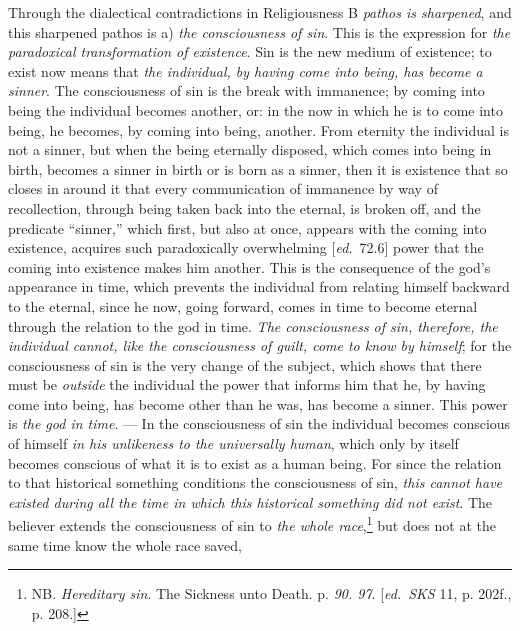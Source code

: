 \documentclass[12pt,a4paper,openany]{book}
\newcommand{\kpage}[1]{\marginnote{\footnotesize\textit{[#1]}}}
\newcommand{\ed}[1]{{\small[\textit{ed.}\ #1]}}
\begin{document}
Through the dialectical contradictions in Religiousness B \emph{pathos is sharpened}, and
this sharpened pathos is a) \emph{the consciousness of sin}. This is the expression
for \emph{the paradoxical transformation of existence}. Sin is the new medium of existence;
to exist now means that \emph{the individual, by having come into being, has become a
sinner}. The consciousness of sin is the break with immanence; by
coming into being the individual becomes another, or: in the now in which he is to come into being,
he becomes, by coming into being, another. From eternity the individual is not
a sinner, but when the being eternally disposed, which comes into being in birth,
\kpage{150}becomes a sinner in birth or is born as a sinner, then it is existence
that so closes in around it that every communication of immanence
by way of recollection, through being taken back into the
eternal, is broken off, and the predicate ``sinner,'' which first, but also at once,
appears with the coming into existence, acquires such paradoxically overwhelming
\ed{72.6} power that the coming into existence makes him another. This is the consequence
of the god's appearance in time, which prevents the
individual from relating himself backward to the eternal, since he now, going forward,
comes in time to become eternal through the relation to the god in time.
\emph{The consciousness of sin, therefore, the individual cannot, like the consciousness of guilt, come to know
by himself}; for the consciousness of sin is the very change of the subject,
which shows that there must be \emph{outside} the individual the power that informs
him that he, by having come into being, has become other than
he was, has become a sinner. This power is \emph{the god in time}. --- In
the consciousness of sin the individual becomes conscious of himself \emph{in his unlikeness to
the universally human}, which only by itself becomes conscious of what
it is to exist as a human being. For since the relation to that historical something
conditions the consciousness of sin, \emph{this cannot have existed during all the time
in which this historical something did not exist}. The believer extends the consciousness of sin
to \emph{the whole race},\footnote[79]{NB. \emph{Hereditary sin}. The Sickness unto Death. p. \emph{90. 97}. \ed{\emph{SKS} 11, p. 202f., p. 208.}}
but does not at the same time know the whole race saved,
\end{document}
